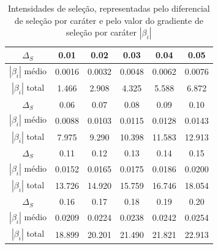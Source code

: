 \begin{table}[htbp]
    \centering
    \caption{Intensidades de seleção, representadas pelo diferencial de
        seleção por caráter e pelo valor do gradiente de seleção por caráter
    $|\beta_i|$}
    \label{tab:betasMFM}
    \vspace{1em}
    \begin{tabular}{c|c|c|c|c|c}
        \toprule
        $\Delta_S$ & 0.01 & 0.02 & 0.03 & 0.04 & 0.05 \\
        \hline
        $|\beta_i|$ médio & 0.0016 & 0.0032 & 0.0048 & 0.0062 & 0.0076 \\
         $|\beta_i|$ total & 1.466 & 2.908 & 4.325 & 5.588 & 6.872 \\
        \midrule
        \midrule
        $\Delta_S$ & 0.06 & 0.07 & 0.08 & 0.09 & 0.10 \\
        \hline
        $|\beta_i|$ médio & 0.0088 & 0.0103 & 0.0115 & 0.0128 & 0.0143 \\        
         $|\beta_i|$ total & 7.975 & 9.290 & 10.398 & 11.583 & 12.913 \\
        \midrule
        \midrule
        $\Delta_S$ & 0.11  & 0.12  & 0.13  & 0.14  & 0.15 \\ 
        \hline
        $|\beta_i|$ médio & 0.0152 & 0.0165 & 0.0175 & 0.0186 & 0.0200 \\    
         $|\beta_i|$ total & 13.726 & 14.920 & 15.759 & 16.746 & 18.054 \\
        \midrule
        \midrule
        $\Delta_S$ & 0.16  & 0.17  & 0.18  & 0.19  & 0.20  \\ 
        \hline
        $|\beta_i|$ médio & 0.0209 & 0.0224 & 0.0238 & 0.0242 & 0.0254 \\
         $|\beta_i|$ total & 18.899 &  20.201 & 21.490 & 21.821 & 22.913  \\
        \bottomrule
    \end{tabular}
\end{table}

